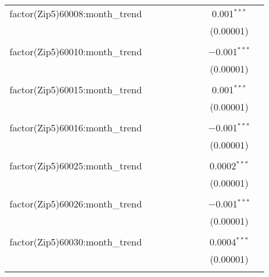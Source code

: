 \begin{table}[H]
{\begin{tabular}{@{\extracolsep{5pt}}lcccccccc}
  factor(Zip5)60008:month\_trend &  &  &  &  &  &  & 0.001$^{***}$ &  \\  

   &  &  &  &  &  &  & (0.00001) &  \\  

   & & & & & & & & \\  

  factor(Zip5)60010:month\_trend &  &  &  &  &  &  & $-$0.001$^{***}$ &  \\  

   &  &  &  &  &  &  & (0.00001) &  \\  

   & & & & & & & & \\  

  factor(Zip5)60015:month\_trend &  &  &  &  &  &  & 0.001$^{***}$ &  \\  

   &  &  &  &  &  &  & (0.00001) &  \\  

   & & & & & & & & \\  

  factor(Zip5)60016:month\_trend &  &  &  &  &  &  & $-$0.001$^{***}$ &  \\  

   &  &  &  &  &  &  & (0.00001) &  \\  

   & & & & & & & & \\  

  factor(Zip5)60025:month\_trend &  &  &  &  &  &  & 0.0002$^{***}$ &  \\  

   &  &  &  &  &  &  & (0.00001) &  \\  

   & & & & & & & & \\  

  factor(Zip5)60026:month\_trend &  &  &  &  &  &  & $-$0.001$^{***}$ &  \\  

   &  &  &  &  &  &  & (0.00001) &  \\  

   & & & & & & & & \\  

  factor(Zip5)60030:month\_trend &  &  &  &  &  &  & 0.0004$^{***}$ &  \\  

   &  &  &  &  &  &  & (0.00001) &  \\  

   & & & & & & & & \\  


\end{tabular}}
\end{table}
